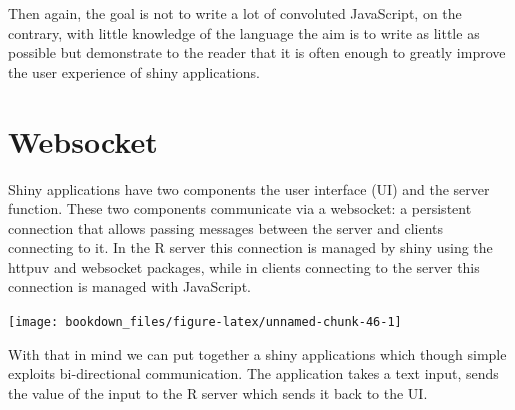 \documentclass[
]{krantz}
\makeatletter
\newenvironment{Shaded}{\begin{snugshade}}{\end{snugshade}}
\newcommand{\ControlFlowTok}[1]{\textcolor[rgb]{0.27,0.27,0.27}{\textbf{#1}}}
\newcommand{\KeywordTok}[1]{\textcolor[rgb]{0.27,0.27,0.27}{\textbf{#1}}}
\newcommand{\NormalTok}[1]{#1}
\newcommand{\OperatorTok}[1]{\textcolor[rgb]{0.43,0.43,0.43}{\textbf{#1}}}
\newcommand{\StringTok}[1]{\textcolor[rgb]{0.5,0.5,0.5}{#1}}
\newenvironment{kframe}{%
\medskip{}
\setlength{\fboxsep}{.8em}
 \def\at@end@of@kframe{}%
 \ifinner\ifhmode%
  \def\at@end@of@kframe{\end{minipage}}%
  \begin{minipage}{\columnwidth}%
 \fi\fi%
 \def\FrameCommand##1{\hskip\@totalleftmargin \hskip-\fboxsep
 \colorbox{shadecolor}{##1}\hskip-\fboxsep
     \hskip-\linewidth \hskip-\@totalleftmargin \hskip\columnwidth}%
 \MakeFramed {\advance\hsize-\width
   \@totalleftmargin\z@ \linewidth\hsize
   \@setminipage}}%
 {\par\unskip\endMakeFramed%
 \at@end@of@kframe}
\renewenvironment{Shaded}{\begin{kframe}}{\end{kframe}}
\makeatother
\begin{document}
Then again, the goal is not to write a lot of convoluted JavaScript, on the contrary, with little knowledge of the language the aim is to write as little as possible but demonstrate to the reader that it is often enough to greatly improve the user experience of shiny applications.

\hypertarget{websocket}{%
\section{Websocket}\label{websocket}}

Shiny applications have two components the user interface (UI) and the server function. These two components communicate via a websocket: a persistent connection that allows passing messages between the server and clients connecting to it. In the R server this connection is managed by shiny using the httpuv \citep{R-httpuv} and websocket \citep{R-websocket} packages, while in clients connecting to the server this connection is managed with JavaScript.

\begin{center}\texttt{[image: bookdown\_files/figure-latex/unnamed-chunk-46-1]} \end{center}

With that in mind we can put together a shiny applications which though simple exploits bi-directional communication. The application takes a text input, sends the value of the input to the R server which sends it back to the UI.

\begin{Shaded}
\end{Shaded}
\end{document}
